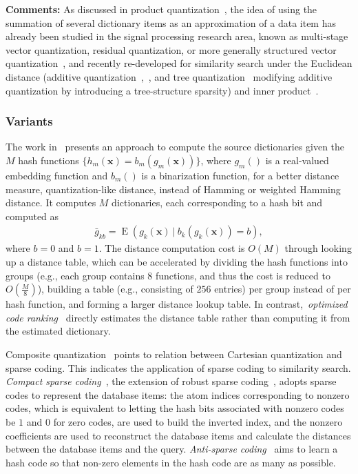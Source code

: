 \documentclass[10pt,journal,compsoc]{IEEEtran}
\begin{document}
\textbf{Comments:}
As discussed in product quantization~\cite{JegouDS11},
the idea of using the summation
of several dictionary items
as an approximation of a data item
has already been studied
in the signal processing research area,
known as multi-stage vector quantization,
residual quantization,
or more generally structured vector quantization~\cite{GrayN98},
and recently re-developed
for similarity search under the Euclidean distance
(additive quantization~\cite{BabenkoK14},~\cite{WangWSXSL14},
and tree quantization~\cite{BabenkoK15}
modifying additive quantization
by introducing a tree-structure sparsity)
and inner product~\cite{DuW14}.

\subsubsection{Variants}
The work in~\cite{GordoPGL14}
presents an approach
to compute the source dictionaries
given the $M$ hash functions $\{h_m(\mathbf{x}) = b_m(g_m(\mathbf{x}))\}$,
where $g_m()$ is a real-valued embedding function
and $b_m()$ is a binarization function,
for a better distance measure,
quantization-like distance,
instead of Hamming or weighted Hamming distance.
It computes $M$ dictionaries,
each corresponding to a hash bit
and computed as
\begin{align}
\bar{g}_{kb} = \operatorname{E}(g_k(\mathbf{x})~|~  b_k(g_k(\mathbf{x})) = b),
\end{align}
where $b=0$ and $b=1$.
The distance computation cost is $O(M)$
through looking up a distance table,
which can be accelerated
by
dividing the hash functions into groups
(e.g., each group contains $8$ functions,
and thus the cost is reduced to $O(\frac{M}{8})$),
building a table (e.g., consisting of $256$ entries)
per group instead of per hash function,
and forming a larger distance lookup table.
In contrast,~\emph{optimized code ranking}~\cite{WangSYYLW14}
directly estimates the distance table
rather than computing it from the estimated dictionary.

Composite quantization~\cite{ZhangDW14}
points to relation between Cartesian quantization
and sparse coding.
This indicates the application of sparse coding to similarity search.
\emph{Compact sparse coding}~\cite{Cherian14},
the extension of robust sparse coding~\cite{CherianMP12},
adopts sparse codes to represent
the database items:
the atom indices corresponding to nonzero codes,
which is equivalent to letting the hash bits associated with nonzero codes
be $1$ and $0$ for zero codes,
are
used to build the inverted index,
and the nonzero coefficients
are used to
reconstruct the database items
and calculate the distances
between the database items and
the query.
\emph{Anti-sparse coding}~\cite{JegouFF12}
aims to learn a hash code
so that non-zero elements in the hash code are as many as possible.
\end{document}
